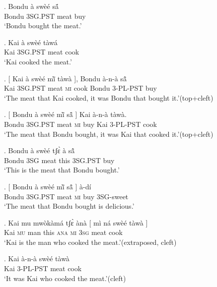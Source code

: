 \documentclass{assets/fieldnotes}
\begin{document}
{\noindent{\rule{\textwidth}{1pt}}

\exg. Bondu à swèé sã́\\
Bondu \textsc{3SG.PST} meat buy\\
`Bondu bought the meat.'

\exg. Kai à swèé tàwá\\
Kai \textsc{3SG.PST} meat cook\\
`Kai cooked the meat.'


\exg. {[} Kai à swèé mĩ̀ tàwà {]}, Bondu à-n-à sã̂\\
{} Kai \textsc{3SG.PST} meat \textsc{mi} cook {} Bondu \textsc{3-PL-PST} buy\\
`The meat that Kai cooked, it was Bondu that bought it.'\hfill{(top+cleft)}\label{kai_cook_bondu_buy_cleft}

\exg. {[} Bondu à swèé mĩ̀ sã̂ {]} Kai à-n-à tàwà.\\
{} Bondu \textsc{3SG.PST} meat \textsc{mi} buy {} Kai \textsc{3-PL-PST} cook\\
`The meat that Bondu bought, it was Kai that cooked it.'\hfill{(top+cleft)}\label{bondu_buy_kai_cook_cleft}

\exg. Bondu à swèé tʃɛ̀ à sã̂\\
Bondu \textsc{3SG} meat this \textsc{3SG.PST} buy\\
`This is the meat that Bondu bought.'

\exg. {[} Bondu à swèé mĩ̀ sã̂ {]} à-dí\\
{} Bondu \textsc{3SG.PST} meat \textsc{mi} buy {} \textsc{3SG}-sweet\\
`The meat that Bondu bought is delicious.'\label{bondu_buy_meat_delicious}


\exg. Kai mu mwòkàmá tʃɛ̀ ànà {[} mì ná swèé tàwà {]}\\
Kai \textsc{mu} man this \textsc{ana} {} \textsc{mi} \textsc{3sg} meat cook {}\\
`Kai is the man who cooked the meat.'\hfill{(extraposed, cleft)}

\exg. Kai à-n-à swèé tàwà\\
Kai \textsc{3-PL-PST} meat cook\\
`It was Kai who cooked the meat.'\hfill{(cleft)}\\

}
\end{document}
